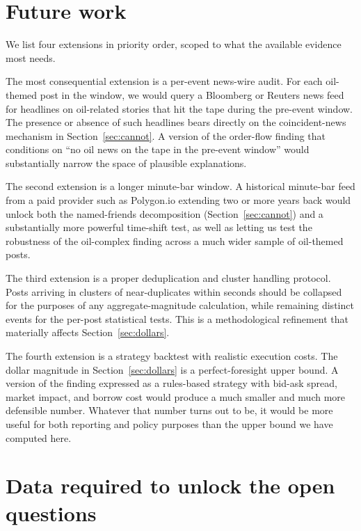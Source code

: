 \documentclass[11pt,a4paper]{article}
\begin{document}
\section{Future work}\label{sec:future}

We list four extensions in priority order, scoped to what the available evidence most needs.

The most consequential extension is a per-event news-wire audit. For each oil-themed post in the window, we would query a Bloomberg or Reuters news feed for headlines on oil-related stories that hit the tape during the pre-event window. The presence or absence of such headlines bears directly on the coincident-news mechanism in Section~\ref{sec:cannot}. A version of the order-flow finding that conditions on ``no oil news on the tape in the pre-event window'' would substantially narrow the space of plausible explanations.

The second extension is a longer minute-bar window. A historical minute-bar feed from a paid provider such as Polygon.io extending two or more years back would unlock both the named-friends decomposition (Section~\ref{sec:cannot}) and a substantially more powerful time-shift test, as well as letting us test the robustness of the oil-complex finding across a much wider sample of oil-themed posts.

The third extension is a proper deduplication and cluster handling protocol. Posts arriving in clusters of near-duplicates within seconds should be collapsed for the purposes of any aggregate-magnitude calculation, while remaining distinct events for the per-post statistical tests. This is a methodological refinement that materially affects Section~\ref{sec:dollars}.

The fourth extension is a strategy backtest with realistic execution costs. The dollar magnitude in Section~\ref{sec:dollars} is a perfect-foresight upper bound. A version of the finding expressed as a rules-based strategy with bid-ask spread, market impact, and borrow cost would produce a much smaller and much more defensible number. Whatever that number turns out to be, it would be more useful for both reporting and policy purposes than the upper bound we have computed here.

\section{Data required to unlock the open questions}\label{sec:data-needed}
\end{document}
